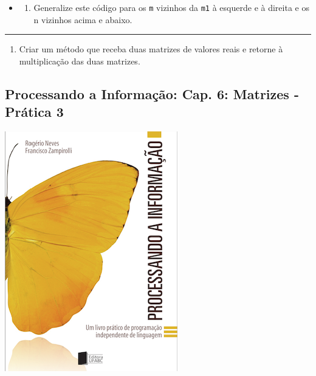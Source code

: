 \documentclass[12pt,a4paper]{article}
\providecommand{\tightlist}{%
      \setlength{\itemsep}{0pt}\setlength{\parskip}{0pt}}
\begin{document}
\begin{itemize}
\item
  \begin{enumerate}
  \def\labelenumi{\alph{enumi})}
  \setcounter{enumi}{1}
  \tightlist
  \item
    Generalize este código para os \texttt{m} vizinhos da \texttt{m1} à
    esquerde e à direita e os n vizinhos acima e abaixo.
  \end{enumerate}
\end{itemize}

    \begin{center}\rule{0.5\linewidth}{0.5pt}\end{center}

\begin{enumerate}
\def\labelenumi{\arabic{enumi}.}
\setcounter{enumi}{4}
\tightlist
\item
  Criar um método que receba duas matrizes de valores reais e retorne à
  multiplicação das duas matrizes.
\end{enumerate}

    \hypertarget{processando-a-informauxe7uxe3o-cap.-6-matrizes---pruxe1tica-3}{%
\subsection{Processando a Informação: Cap. 6: Matrizes - Prática
3}\label{processando-a-informauxe7uxe3o-cap.-6-matrizes---pruxe1tica-3}}

    \includegraphics{"figs/Capa_Processando_Informacao.jpg"}
\end{document}

